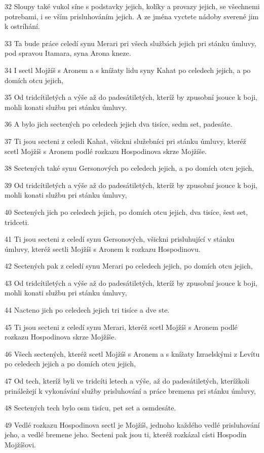 \par 32 Sloupy také vukol síne s podstavky jejich, kolíky a provazy jejich, se všechnemi potrebami, i se vším prisluhováním jejich. A ze jména vyctete nádoby sverené jim k ostríhání.
\par 33 Ta bude práce celedí synu Merari pri všech službách jejich pri stánku úmluvy, pod spravou Itamara, syna Arona kneze.
\par 34 I sectl Mojžíš s Aronem a s knížaty lidu syny Kahat po celedech jejich, a po domích otcu jejich,
\par 35 Od tridcítiletých a výše až do padesátiletých, kteríž by zpusobní jsouce k boji, mohli konati službu pri stánku úmluvy.
\par 36 A bylo jich sectených po celedech jejich dva tisíce, sedm set, padesáte.
\par 37 Ti jsou secteni z celedi Kahat, všickni služebníci pri stánku úmluvy, kteréž scetl Mojžíš s Aronem podlé rozkazu Hospodinova skrze Mojžíše.
\par 38 Sectených také synu Gersonových po celedech jejich, a po domích otcu jejich,
\par 39 Od tridcítiletých a výše až do padesátiletých, kteríž by zpusobní jsouce k boji, mohli konati službu pri stánku úmluvy,
\par 40 Sectených jich po celedech jejich, po domích otcu jejich, dva tisíce, šest set, tridceti.
\par 41 Ti jsou secteni z celedí synu Gersonových, všickni prisluhující v stánku úmluvy, kteréž sectli Mojžíš s Aronem k rozkazu Hospodinovu.
\par 42 Sectených pak z celedí synu Merari po celedech jejich, po domích otcu jejich,
\par 43 Od tridcítiletých a výše až do padesátiletých, kteríž by zpusobní jsouce k boji, mohli konati službu pri stánku úmluvy,
\par 44 Nacteno jich po celedech jejich tri tisíce a dve ste.
\par 45 Ti jsou secteni z celedí synu Merari, kteréž scetl Mojžíš s Aronem podlé rozkazu Hospodinova skrze Mojžíše.
\par 46 Všech sectených, kteréž scetl Mojžíš s Aronem a s knížaty Izraelskými z Levítu po celedech jejich a po domích otcu jejich,
\par 47 Od tech, kteríž byli ve tridcíti letech a výše, až do padesátiletých, kterížkoli prináležejí k vykonávání služby prisluhování a práce bremena pri stánku úmluvy,
\par 48 Sectených tech bylo osm tisícu, pet set a osmdesáte.
\par 49 Vedlé rozkazu Hospodinova sectl je Mojžíš, jednoho každého vedlé prisluhování jeho, a vedlé bremene jeho. Secteni pak jsou ti, kteréž rozkázal císti Hospodin Mojžíšovi.

